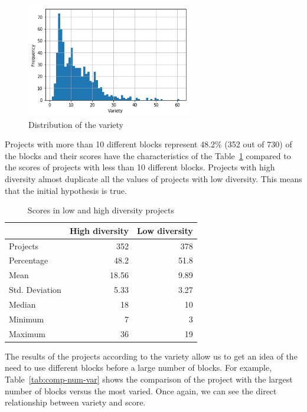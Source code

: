 \documentclass[a4paper]{article}
\begin{document}
\begin{figure}
\begin{center}
\includegraphics[height=5cm]{fig1}
\caption{Distribution of the variety}
\label{fig:var-dist}
\end{center}
\end{figure}

Projects with more than 10 different blocks represent 48.2\% (352 out of 730) of the blocks and their scores have the characteristics of the Table~\ref{tab:comparison} compared to the scores of projects with less than 10 different blocks. Projects with high diversity almost duplicate all the values of projects with low diversity. This means that the initial hypothesis is true.

\begin{table}
\begin{center}
\caption{Scores in low and high diversity projects}
\bigskip
\label{tab:comparison}
\begin{tabular}{|l|r|r|}
\hline
& High diversity & Low diversity \\ \hline
Projects & 352 & 378\\ \hline
Percentage & 48.2 & 51.8\\ \hline
Mean & 18.56 & 9.89\\ \hline
Std. Deviation & 5.33 & 3.27\\ \hline
Median & 18 & 10\\ \hline
Minimum & 7 & 3\\ \hline
Maximum & 36 & 19\\ \hline
\end{tabular}
\end{center}
\end{table}

The results of the projects according to the variety allow us to get an idea of the need to use different blocks before a large number of blocks. For example, Table~\ref{tab:comp-num-var} shows the comparison of the project with the largest number of blocks versus the most varied. Once again, we can see the direct relationship between variety and score.
\end{document}
